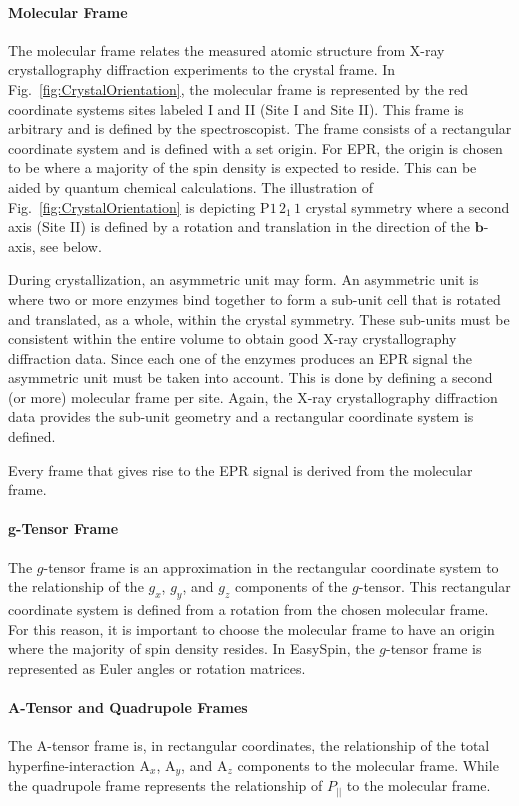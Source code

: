 \paragraph*{Molecular Frame} The molecular frame relates the measured atomic structure from X-ray crystallography diffraction experiments to the crystal frame. In Fig.~\ref{fig:CrystalOrientation}, the molecular frame is represented by the red coordinate systems sites labeled I and II (Site I and Site II). This frame is arbitrary and is defined by the spectroscopist. The frame consists of a rectangular coordinate system and is defined with a set origin. For EPR, the origin is chosen to be where a majority of the spin density is expected to reside. This can be aided by quantum chemical calculations. The illustration of Fig.~\ref{fig:CrystalOrientation} is depicting P$1\,2_1\,1$ crystal symmetry where a second axis (Site II) is defined by a rotation and translation in the direction of the $\mathbf{b}$-axis, see below. 

During crystallization, an asymmetric unit may form. An asymmetric unit is where two or more enzymes bind together to form a sub-unit cell that is rotated and translated, as a whole, within the crystal symmetry. These sub-units must be consistent within the entire volume to obtain good X-ray crystallography diffraction data. Since each one of the enzymes produces an EPR signal the asymmetric unit must be taken into account. This is done by defining a second (or more) molecular frame per site. Again, the X-ray crystallography diffraction data provides the sub-unit geometry and a rectangular coordinate system is defined. 

Every frame that gives rise to the EPR signal is derived from the molecular frame. 

\paragraph{g-Tensor Frame} The $g$-tensor frame is an approximation in the rectangular coordinate system to the relationship of the $g_x$, $g_y$, and $g_z$ components of the $g$-tensor. This rectangular coordinate system is defined from a rotation from the chosen molecular frame. For this reason, it is important to choose the molecular frame to have an origin where the majority of spin density resides. In EasySpin, the $g$-tensor frame is represented as Euler angles or rotation matrices.

\paragraph{A-Tensor and Quadrupole Frames} The A-tensor frame is, in rectangular coordinates, the relationship of the total hyperfine-interaction A$_x$, A$_y$, and A$_z$ components to the molecular frame. While the quadrupole frame represents the relationship of $P_{||}$ to the molecular frame. 

